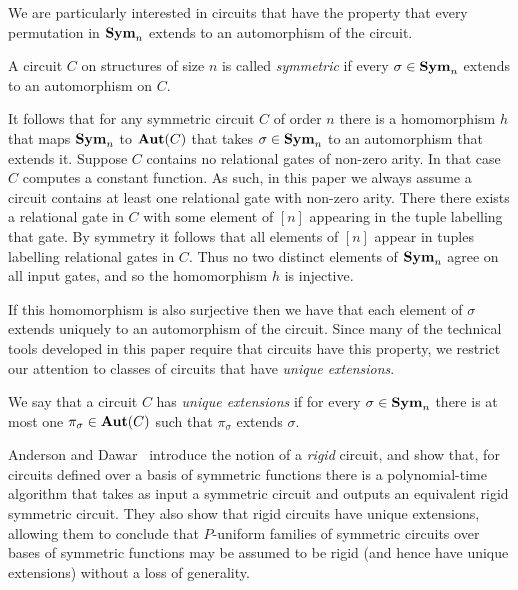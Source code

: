 \documentclass[../paper.tex]{subfiles}
\begin{document}
We are particularly interested in circuits that have the property that every
permutation in $\text{\textbf{Sym}}_n$ extends to an automorphism of the circuit.

\begin{definition}[Symmetry]
  A circuit $C$ on structures of size $n$ is called \emph{symmetric} if every
  $\sigma \in \text{\textbf{Sym}}_n$ extends to an automorphism on $C$.
\end{definition}

It follows that for any symmetric circuit $C$ of order $n$ there is a
homomorphism $h$ that maps $\text{\textbf{Sym}}_n$ to $\text{\textbf{Aut}}(C)$ that takes $\sigma \in \text{\textbf{Sym}}_n$
to an automorphism that extends it. Suppose $C$ contains no relational gates of
non-zero arity. In that case $C$ computes a constant function. As such, in this
paper we always assume a circuit contains at least one relational gate with
non-zero arity. There there exists a relational gate in $C$ with some element of
$[n]$ appearing in the tuple labelling that gate. By symmetry it follows that
all elements of $[n]$ appear in tuples labelling relational gates in $C$. Thus
no two distinct elements of $\text{\textbf{Sym}}_n$ agree on all input gates, and so the
homomorphism $h$ is injective.

If this homomorphism is also surjective then we have that each element of
$\sigma$ extends uniquely to an automorphism of the circuit. Since many of the
technical tools developed in this paper require that circuits have this
property, we restrict our attention to classes of circuits that have
\emph{unique extensions}.

\begin{definition}
  We say that a circuit $C$ has \emph{unique extensions} if for every $\sigma
  \in \text{\textbf{Sym}}_n$ there is at most one $\pi_{\sigma} \in \text{\textbf{Aut}}(C)$ such that
  $\pi_{\sigma}$ extends $\sigma$.
\end{definition}

Anderson and Dawar~\cite{AndersonD17} introduce the notion of a \emph{rigid}
circuit, and show that, for circuits defined over a basis of symmetric functions
there is a polynomial-time algorithm that takes as input a symmetric circuit and
outputs an equivalent rigid symmetric circuit. They also show that rigid
circuits have unique extensions, allowing them to conclude that $P$-uniform
families of symmetric circuits over bases of symmetric functions may be assumed
to be rigid (and hence have unique extensions) without a loss of generality.

\end{document}
